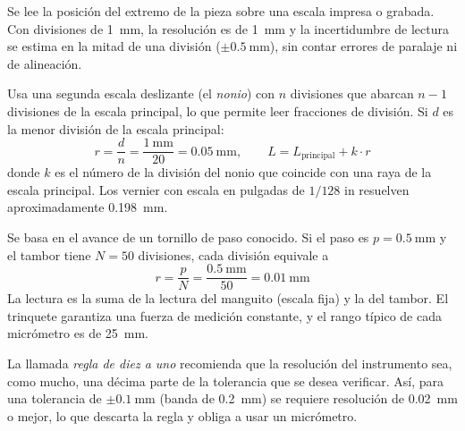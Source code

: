 \documentclass[12pt,a4paper]{article}
\begin{document}
\begin{description}[leftmargin=0pt,style=unboxed,labelindent=0pt]
	\item[Regla y escuadra graduadas.] Se lee la posición del extremo de la pieza
	      sobre una escala impresa o grabada. Con divisiones de
	      \SI{1}{\milli\metre}, la
	      resolución es de \SI{1}{\milli\metre} y la incertidumbre de lectura se
	      estima en la mitad de una división ($\pm\SI{0.5}{\milli\metre}$), sin
	      contar errores de paralaje ni de alineación.\\[-4pt]
	\item[Vernier o pie de rey.] Usa una segunda escala deslizante (el
	      \emph{nonio}) con $n$ divisiones que abarcan $n-1$ divisiones de la
	      escala principal, lo que permite leer fracciones de división. Si $d$ es
	      la menor división de la escala principal:
	      \[
		      r = \frac{d}{n} = \frac{\SI{1}{\milli\metre}}{20} =
		      \SI{0.05}{\milli\metre},
		      \qquad L = L_{\text{principal}} + k\cdot r
	      \]
	      donde $k$ es el número de la división del nonio que coincide con una
	      raya de la escala principal. Los vernier con escala en pulgadas de
	      $1/128$ in resuelven aproximadamente \SI{0.198}{\milli\metre}.\\[-4pt]
	\item[Micrómetro de exteriores.] Se basa en el avance de un tornillo de paso
	      conocido. Si el paso es $p = \SI{0.5}{\milli\metre}$ y el tambor tiene
	      $N = 50$
	      divisiones, cada división equivale a
	      \[
		      r = \frac{p}{N} = \frac{\SI{0.5}{\milli\metre}}{50} =
		      \SI{0.01}{\milli\metre}
	      \]
	      La lectura es la suma de la lectura del manguito (escala fija) y la del
	      tambor. El trinquete garantiza una fuerza de medición constante, y el
	      rango típico de cada micrómetro es de \SI{25}{\milli\metre}.
\end{description}

\begin{nota}
	La llamada \emph{regla de diez a uno} recomienda que la resolución del
	instrumento sea, como mucho, una décima parte de la tolerancia que se desea
	verificar. Así, para una tolerancia de $\pm\SI{0.1}{\milli\metre}$ (banda de
	\SI{0.2}{\milli\metre}) se requiere resolución de \SI{0.02}{\milli\metre} o
	mejor, lo que descarta la regla y obliga a usar un micrómetro.
\end{nota}

\end{document}
